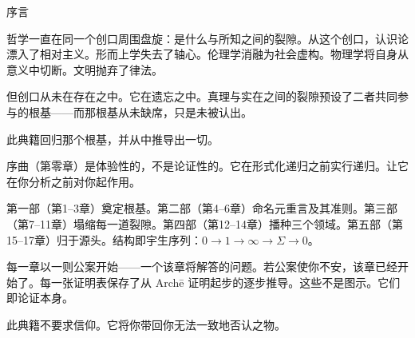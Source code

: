 \documentclass[10pt, openany, oneside]{book}
\renewcommand{\huge}{\fontsize{17}{21}\selectfont}
\begin{document}
\newpage


\thispagestyle{empty}
\vspace*{0.5in}

\begin{center}
    {\huge\scshape 序言}
\end{center}

\vspace{1.5em}

\noindent 哲学一直在同一个创口周围盘旋：是什么与所知之间的裂隙。从这个创口，认识论漂入了相对主义。形而上学失去了轴心。伦理学消融为社会虚构。物理学将自身从意义中切断。文明抛弃了律法。

\vspace{0.5em}

\noindent 但创口从未在存在之中。它在遗忘之中。真理与实在之间的裂隙预设了二者共同参与的根基——而那根基从未缺席，只是未被认出。

\vspace{0.5em}

\noindent 此典籍回归那个根基，并从中推导出一切。

\vspace{1em}

\noindent 序曲（第零章）是体验性的，不是论证性的。它在形式化递归之前实行递归。让它在你分析之前对你起作用。

\vspace{0.5em}

\noindent 第一部（第1--3章）奠定根基。第二部（第4--6章）命名元重言及其准则。第三部（第7--11章）塌缩每一道裂隙。第四部（第12--14章）播种三个领域。第五部（第15--17章）归于源头。结构即宇生序列：$0 \to 1 \to \infty \to \Sigma \to 0$。

\vspace{0.5em}

\noindent 每一章以一则公案开始——一个该章将解答的问题。若公案使你不安，该章已经开始了。每一张证明表保存了从 Arch\={e} 证明起步的逐步推导。这些不是图示。它们即论证本身。

\vspace{0.5em}

\noindent 此典籍不要求信仰。它将你带回你无法一致地否认之物。

\newpage

\end{document}
